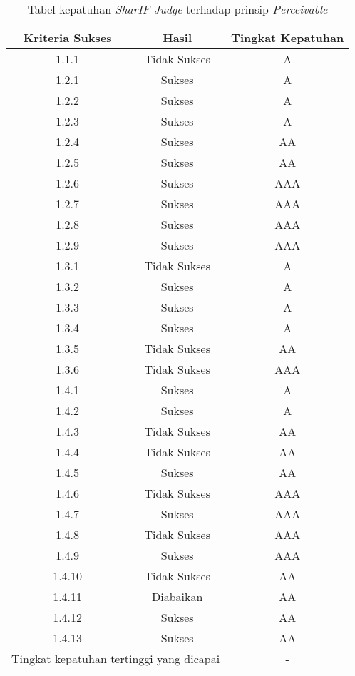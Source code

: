 \begin{table}[H]
	\centering
	\caption{Tabel kepatuhan \textit{SharIF Judge} terhadap prinsip \textit{Perceivable}}
	\label{tab:kepatuhan_sharif_judge_perceivable}
	\begin{tabular}{|c|c|c|}
		\hline
		Kriteria Sukses & Hasil & Tingkat Kepatuhan \\
		\hline
		\rowcolor{Pink} 1.1.1 & Tidak Sukses & A\\
		1.2.1 & Sukses & A\\
		1.2.2 & Sukses & A\\
		1.2.3 & Sukses & A\\
		1.2.4 & Sukses & AA\\
		1.2.5 & Sukses & AA\\
		1.2.6 & Sukses & AAA\\
		1.2.7 & Sukses & AAA\\
		1.2.8 & Sukses & AAA\\
		1.2.9 & Sukses & AAA\\
		\rowcolor{Pink} 1.3.1 & Tidak Sukses & A\\
		1.3.2 & Sukses & A\\
		1.3.3 & Sukses & A\\
		1.3.4 & Sukses & A\\
		\rowcolor{LightRed} 1.3.5 & Tidak Sukses & AA \\
		\rowcolor{Red} 1.3.6 & Tidak Sukses & AAA \\
		1.4.1 & Sukses & A\\
		1.4.2 & Sukses & A\\
		\rowcolor{LightRed} 1.4.3 & Tidak Sukses & AA\\
		\rowcolor{LightRed} 1.4.4 & Tidak Sukses & AA\\
		1.4.5 & Sukses & AA\\
		\rowcolor{Red} 1.4.6 & Tidak Sukses & AAA\\
		1.4.7 & Sukses & AAA\\
		\rowcolor{Red} 1.4.8 & Tidak Sukses & AAA\\
		1.4.9 & Sukses & AAA\\
		\rowcolor{LightRed} 1.4.10 & Tidak Sukses & AA \\
		\rowcolor{Gray} 1.4.11 & Diabaikan & AA \\
		1.4.12 & Sukses & AA\\
		1.4.13 & Sukses & AA\\
		\hline
		\multicolumn{2}{|c|}{Tingkat kepatuhan tertinggi yang dicapai} & - \\
		\hline
	\end{tabular}
\end{table}

